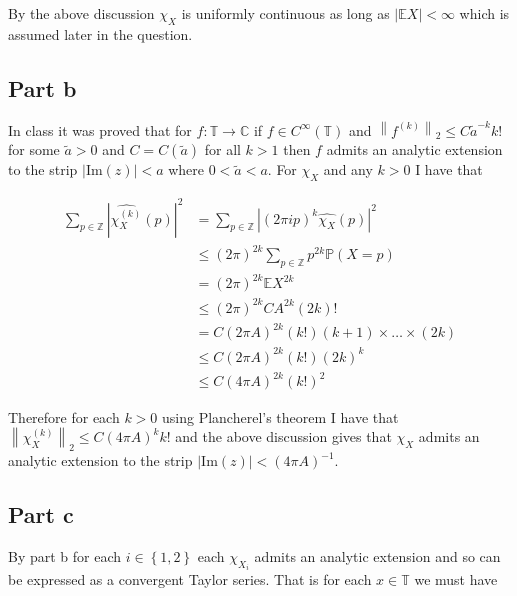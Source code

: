 \documentclass{article}
\begin{document}
By the above discussion $\chi_X$ is uniformly continuous as long as $\left | \mathbb{E} X \right | < \infty$ which is assumed later in the question. 

\subsection*{Part b}

In class it was proved that for $f : \mathbb{T} \rightarrow \mathbb{C}$ if $f \in C^\infty \left ( \mathbb{T} \right )$ and $\left \| f^{(k)} \right \|_2 \leq C \tilde{a}^{-k} k!$ for some $\tilde{a} > 0$ and $C = C(\tilde{a})$ for all $k > 1$ then $f$ admits an analytic extension to the strip $\left | \text{Im} \left ( z \right ) \right | < a$ where $0 < \tilde{a} < a $. For $\chi_X$ and any $k > 0$ I have that 

\begin{align}
	\sum_{p \in \mathbb{Z}} \left | \widehat{\chi_X^{(k)}} \left ( p \right ) \right |^2 & = \sum_{p \in \mathbb{Z}} \left | \left ( 2 \pi i p \right )^k \widehat{\chi_X} \left ( p \right ) \right |^2 \\ 
	& \leq \left ( 2 \pi \right ) ^ {2k} \sum_{p \in \mathbb{Z}} p^{2k} \mathbb{P} \left ( X = p \right ) \\ 
	& = \left ( 2 \pi \right ) ^ {2k} \mathbb{E} X^{2k} \\ 
	& \leq \left ( 2 \pi \right ) ^ {2k} C A^{2k} \left ( 2k \right ) ! \\
	& = C \left ( 2 \pi A \right )^{2k} \left ( k! \right ) (k+1) \times \dots \times (2k) \\ 
	& \leq C \left ( 2 \pi A \right )^{2k} \left ( k! \right ) \left ( 2k \right ) ^ k \\ 
	& \leq C \left ( 4 \pi A \right )^{2k} \left ( k! \right )^2
\end{align}

Therefore for each $k > 0$ using Plancherel's theorem I have that $\left \| \chi_X^{(k)} \right \|_2 \leq C \left ( 4 \pi A \right )^{k} k!$ and the above discussion gives that $\chi_X$ admits an analytic extension to the strip $\left | \text{Im} \left ( z \right ) \right | < \left ( 4 \pi A \right )^{-1}$. 

\subsection*{Part c}

By part b for each $i \in \left \{ 1 , 2 \right \}$ each $\chi_{X_i}$ admits an analytic extension and so can be expressed as a convergent Taylor series. That is for each $x \in \mathbb{T}$ we must have
\end{document}
